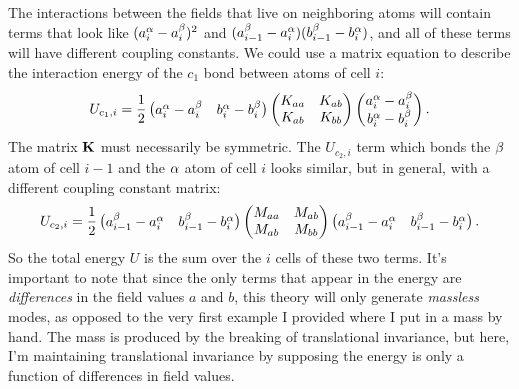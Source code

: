 \documentclass[12pt]{article}
\begin{document}
The interactions between the fields that live on neighboring atoms will contain 
terms that look like $(a^\alpha_i - a^\beta_i)^2$ and $(a^\beta_{i-1} - 
a^\alpha_i)(b^\beta_{i-1} - b^\alpha_i)$, and all of these terms will have different 
coupling constants. We could use a matrix equation to describe the interaction 
energy of the $c_1$ bond between atoms of cell $i$:
\[ U_{c_1,i} = \frac{1}{2} \left(\begin{matrix}a^\alpha_i - a^\beta_i & b^\alpha_i - b^\beta_i\end{matrix}\right)
 \left(\begin{matrix}K_{aa} & K_{ab} \\ K_{ab} & K_{bb}\end{matrix}\right) \left(\begin{matrix}a^\alpha_i - a^\beta_i \\ b^\alpha_i - 
b^\beta_i\end{matrix}\right).\]
The matrix $\mathbf{K}$ must necessarily be symmetric. The $U_{c_2,i}$ term which bonds 
the $\beta$ atom of cell $i-1$ and the $\alpha$ atom of cell $i$ looks similar, but in 
general, with a different coupling constant matrix:
\[ U_{c_2,i} = \frac{1}{2} \left(\begin{matrix}a^\beta_{i-1} - a^\alpha_i & b^\beta_{i-1} - b^\alpha_i\end{matrix}\right)
 \left(\begin{matrix}M_{aa} & M_{ab} \\ M_{ab} & M_{bb}\end{matrix}\right) \left(\begin{matrix}a^\beta_{i-1} - a^\alpha_i & 
b^\beta_{i-1} - b^\alpha_i\end{matrix}\right).\]
So the total energy $U$ is the sum over the $i$ cells of these two terms. It's 
important to note that since the only terms that appear in the energy are 
\emph{differences} in the field values $a$ and $b$, this theory will only 
generate \emph{massless} modes, as opposed to the very first example I 
provided where I put in a mass by hand. The mass is produced by the breaking of 
translational invariance, but here, I'm maintaining translational invariance by 
supposing the energy is only a function of differences in field values.
\end{document}
